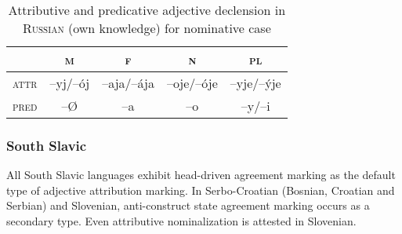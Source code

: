 \begin{table}[h]
\begin{center}
\begin{footnotesize}
\begin{tabular}[t]{l|c c c c}
\lsptoprule			
			&\textsc{m}	&\textsc{f}		&\textsc{n}	&\textsc{pl}\\
\hline
\textsc{attr}	&–yj/–ój		&–aja/–ája	&–oje/–óje	&–yje/–\'yje\\
\textsc{pred}	&–{Ø}		&–a			&–o			&–y/–i\\
			\hline
			\hline
\end{tabular}
\caption[Adjective paradigm for \textsc{Russian}]{Attributive and predicative adjective declension in \textsc{Russian} (own knowledge) for nominative case}
\label{Russian adj agr paradigm}
\end{footnotesize}
\end{center}
\end{table}

\subsubsection{South Slavic} \label{s-slavic synchr}
All South Slavic languages exhibit head-driven agreement marking as the default type of adjective attribution marking. In Serbo-Croatian (Bosnian, Croatian and Serbian) and Slovenian, anti-construct state agreement marking occurs as a secondary type. Even attributive nominalization is attested in Slovenian.

